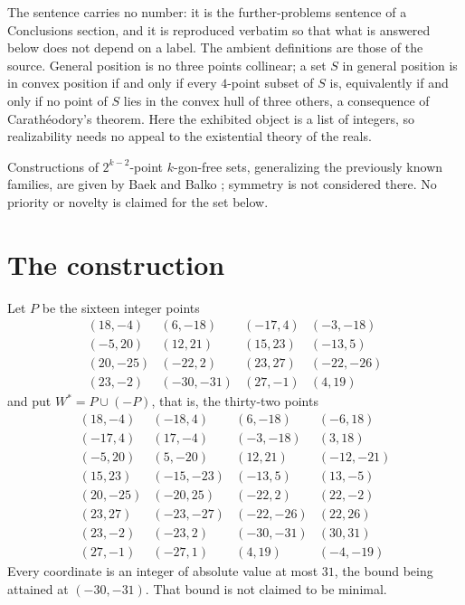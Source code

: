 \documentclass[11pt]{amsart}
\theoremstyle{remark}
\begin{document}
\noindent
The sentence carries no number: it is the further-problems sentence of a
Conclusions section, and it is reproduced verbatim so that what is answered
below does not depend on a label. The ambient definitions are those of the
source. General position is no three points collinear; a set $S$ in general
position is in convex position if and only if every $4$-point subset of $S$ is,
equivalently if and only if no point of $S$ lies in the convex hull of three
others, a consequence of Carath\'eodory's theorem. Here the exhibited object is
a list of integers, so realizability needs no appeal to the existential theory
of the reals.

Constructions of $2^{k-2}$-point $k$-gon-free sets, generalizing the previously
known families, are given by Baek and Balko \cite{BaekBalko}; symmetry is not
considered there. No priority or novelty is claimed for the set below.

\section{The construction}\label{sec:result}

Let $P$ be the sixteen integer points
\[
\begin{array}{cccc}
 (18,-4) & (6,-18) & (-17,4) & (-3,-18)\\
 (-5,20) & (12,21) & (15,23) & (-13,5)\\
 (20,-25) & (-22,2) & (23,27) & (-22,-26)\\
 (23,-2) & (-30,-31) & (27,-1) & (4,19)
\end{array}
\]
and put $W^{*}=P\cup(-P)$, that is, the thirty-two points
\[
\begin{array}{cccc}
 (18,-4) & (-18,4) & (6,-18) & (-6,18)\\
 (-17,4) & (17,-4) & (-3,-18) & (3,18)\\
 (-5,20) & (5,-20) & (12,21) & (-12,-21)\\
 (15,23) & (-15,-23) & (-13,5) & (13,-5)\\
 (20,-25) & (-20,25) & (-22,2) & (22,-2)\\
 (23,27) & (-23,-27) & (-22,-26) & (22,26)\\
 (23,-2) & (-23,2) & (-30,-31) & (30,31)\\
 (27,-1) & (-27,1) & (4,19) & (-4,-19)
\end{array}
\]
Every coordinate is an integer of absolute value at most $31$, the bound being
attained at $(-30,-31)$. That bound is not claimed to be minimal.
\end{document}
